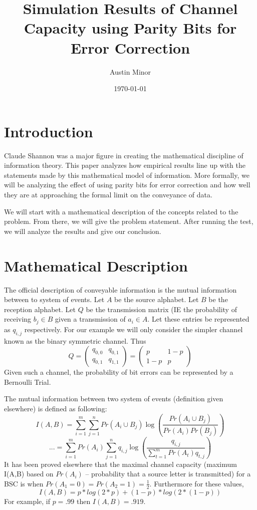 \documentclass{article}
\author{Austin Minor}
\title{Simulation Results of Channel Capacity using Parity Bits for Error Correction}
\date{\today}
\begin{document}
   \maketitle

   \section{Introduction}
      Claude Shannon was a major figure in creating the
      mathematical discipline of information theory. This
      paper analyzes how empirical results line up with
      the statements made by this mathematical model of
      information. More formally, we will be analyzing
      the effect of using parity bits for error correction
      and how well they are at approaching the formal limit
      on the conveyance of data.

      We will start with a mathematical description of the
      concepts related to the problem. From there, we will
      give the problem statement. After running the test,
      we will analyze the results and give our conclusion.
   \section{Mathematical Description}
      The official description of conveyable information
      is the mutual information between to system of events.
      Let $A$ be the source alphabet. Let $B$ be the reception
      alphabet. Let $Q$ be the transmission matrix (IE the
      probability of receiving $b_j \in B$ given a transmission
      of $a_i \in A$. Let these entries be represented as $q_{i,j}$
      respectively. For our example we will only consider the
      simpler channel known as the binary symmetric channel.
      Thus \[ Q =
      \begin{pmatrix}
         q_{0,0} & q_{0,1} \\
         q_{0,1} & q_{1,1}
      \end{pmatrix}
      =
      \begin{pmatrix}
         p & 1-p \\
         1-p & p
      \end{pmatrix}
      \]
      Given such a channel, the probability of bit errors
      can be represented by a Bernoulli Trial.

      The mutual information between two system of events (definition
      given elsewhere) is defined as following:
      \[
         I(A,B) =
         \sum_{i=1}^{m}
         \sum_{j=1}^{n}
         Pr(A_i \cup B_j)
         \log \left(\frac{Pr(A_i \cup B_j)}{Pr(A_i)Pr(B_j)}\right)
      \]
      \[
         ... =
         \sum_{i=1}^{m}
         Pr(A_i)
         \sum_{j=1}^{n}
         q_{i,j}
         \log \left(\frac{q_{i,j}}{\sum_{t=1}^{m} Pr(A_t) q_{t,j}}\right)
      \]
      It has been proved elsewhere that the maximal channel capacity
      (maximum I(A,B) based on $Pr(A_i)$ -- probability that a source letter
      is transmitted) for a BSC is when $Pr(A_1=0)=Pr(A_2=1)=\frac{1}{2}$.
      Furthermore for these values, 
      \[
      I(A,B) = p*log(2*p) + (1-p)*log(2*(1-p))
      \]
      For example, if $p = .99$ then $I(A,B) = .919$.
\end{document}
